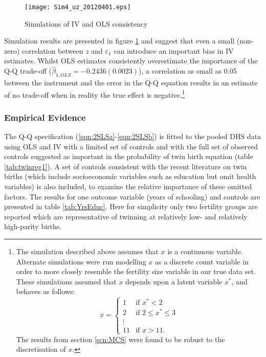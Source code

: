 \documentclass{article}[11pt,subeqn]
\begin{document}
\begin{spacing}{1.5}
\begin{figure}[!htbp]
\caption{Simulations of IV and OLS consistency}
\label{fig:MC}
\begin{center}
\vspace{-4mm}
\texttt{[image: Sim4\_uz\_20120401.eps]}
\end{center}
\end{figure}


Simulation results are presented in figure \ref{fig:MC} and suggest that even a small (non-zero) correlation between $z$ and $\varepsilon_1$ can introduce an 
important bias in IV estimates.  Whilst OLS estimates consistently overestimate the importance of the Q-Q trade-off ($\hat{\beta}_{1,OLS}=-0.2436 (0.0023)$), a correlation
as small as 0.05 between the instrument and the error in the Q-Q equation results in an estimate of no trade-off when in reality the true effect is negative.\footnote{The
simulation described above assumes that $x$ is a continuous variable.  Alternate simulations were run modelling $x$ as a discrete count variable in order to more closely resemble 
the fertility size variable in our true data set.  These simulations assumed that $x$ depends upon a latent variable $x^*$, and behaves as follows:
\[ x = \left\{ \begin{array}{ll}
         1 & \mbox{if $x^* < 2$}\\
         2 & \mbox{if $2\leq x^* \leq 3$}\\
        \vdots & \\
        11 & \mbox{if $x > 11$}.\end{array} \right. \]
 The results from section \ref{scn:MCS} were found to be robust to the discretisation of $x$.
}
\subsubsection{Empirical Evidence}
\label{scn:EE}
The Q-Q specification (\ref{eqn:2SLSa}-\ref{eqn:2SLSb}) is fitted to the pooled DHS data using OLS and IV with a limited set of controls and with the full set of observed 
controls suggested as important in the probability of twin birth equation (table \ref{tab:twinreg1}).  A set of controls consistent with the recent literature on twin births (which 
include socioeconomic variables such as education but omit health variables) is also included, to examine the relative importance of these omitted factors.  The results for one 
outcome variable (years of schooling) and controls are presented in table \ref{tab:YrsEduc}.  Here for simplicity only two fertility groups are reported which are representative
of twinning at relatively low- and relatively high-parity births.



\end{spacing}
\end{document}
